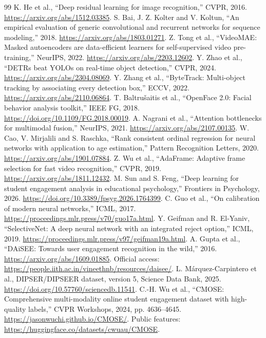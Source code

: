 \documentclass[10pt,a4paper]{article}
\begin{document}
{\small
\begin{thebibliography}{99}
 K. He et al., ``Deep residual learning for image recognition,'' CVPR, 2016. \url{https://arxiv.org/abs/1512.03385}.
 S. Bai, J. Z. Kolter and V. Koltun, ``An empirical evaluation of generic convolutional and recurrent networks for sequence modeling,'' 2018. \url{https://arxiv.org/abs/1803.01271}.
 Z. Tong et al., ``VideoMAE: Masked autoencoders are data-efficient learners for self-supervised video pre-training,'' NeurIPS, 2022. \url{https://arxiv.org/abs/2203.12602}.
 Y. Zhao et al., ``DETRs beat YOLOs on real-time object detection,'' CVPR, 2024. \url{https://arxiv.org/abs/2304.08069}.
 Y. Zhang et al., ``ByteTrack: Multi-object tracking by associating every detection box,'' ECCV, 2022. \url{https://arxiv.org/abs/2110.06864}.
 T. Baltru\v{s}aitis et al., ``OpenFace 2.0: Facial behavior analysis toolkit,'' IEEE FG, 2018. \url{https://doi.org/10.1109/FG.2018.00019}.
 A. Nagrani et al., ``Attention bottlenecks for multimodal fusion,'' NeurIPS, 2021. \url{https://arxiv.org/abs/2107.00135}.
 W. Cao, V. Mirjalili and S. Raschka, ``Rank consistent ordinal regression for neural networks with application to age estimation,'' Pattern Recognition Letters, 2020. \url{https://arxiv.org/abs/1901.07884}.
 Z. Wu et al., ``AdaFrame: Adaptive frame selection for fast video recognition,'' CVPR, 2019. \url{https://arxiv.org/abs/1811.12432}.
 M. Sun and S. Feng, ``Deep learning for student engagement analysis in educational psychology,'' Frontiers in Psychology, 2026. \url{https://doi.org/10.3389/fpsyg.2026.1764399}.
 C. Guo et al., ``On calibration of modern neural networks,'' ICML, 2017. \url{https://proceedings.mlr.press/v70/guo17a.html}.
 Y. Geifman and R. El-Yaniv, ``SelectiveNet: A deep neural network with an integrated reject option,'' ICML, 2019. \url{https://proceedings.mlr.press/v97/geifman19a.html}.
 A. Gupta et al., ``DAiSEE: Towards user engagement recognition in the wild,'' 2016. \url{https://arxiv.org/abs/1609.01885}. Official access: \url{https://people.iith.ac.in/vineethnb/resources/daisee/}.
 L. M\'arquez-Carpintero et al., DIPSER/DIPSEER dataset, version 5, Science Data Bank, 2025. \url{https://doi.org/10.57760/sciencedb.11541}.
 C.-H. Wu et al., ``CMOSE: Comprehensive multi-modality online student engagement dataset with high-quality labels,'' CVPR Workshops, 2024, pp. 4636--4645. \url{https://jasonwuchi.github.io/CMOSE/}. Public features: \url{https://huggingface.co/datasets/cwuau/CMOSE}.
\end{thebibliography}
}
\end{document}

